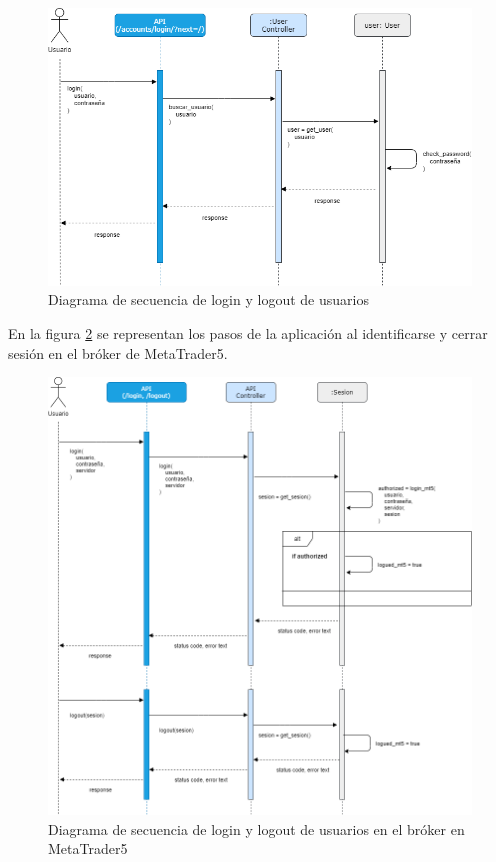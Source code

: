 \begin{figure}[h] 
	\includegraphics[width=1\textwidth]{imagenes/diagramas_secuencia/login_logout.png}
	\caption{Diagrama de secuencia de login y logout de usuarios} \label{login_logout}
\end{figure}

En la figura \ref{login_logout_MT5} se representan los pasos de la aplicación al identificarse y cerrar sesión en el bróker de MetaTrader5.\newline

\begin{figure}[h] 
	\includegraphics[width=1.1\textwidth]{imagenes/diagramas_secuencia/login_logout_mt5.png}
	\caption{Diagrama de secuencia de login y logout de usuarios en el bróker en MetaTrader5} \label{login_logout_MT5}
\end{figure}

